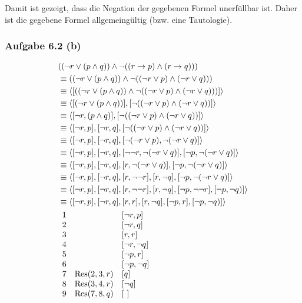 Damit ist gezeigt, dass die Negation der gegebenen Formel unerfüllbar ist. 
Daher ist die gegebene Formel allgemeingültig (bzw. eine Tautologie).

\subsubsection{Aufgabe 6.2 (b)}
\begin{align*}
	&((\neg r\vee(p\wedge q))\wedge\neg((r\to p)\wedge(r\to q)))\\
	&\equiv
	((\neg r\vee(p\wedge q))\wedge\neg((\neg r\vee p)\wedge(\neg r\vee q)))\\
	&\equiv
	\langle[((\neg r\vee(p\wedge q))\wedge\neg((\neg r\vee p)\wedge(\neg r\vee q)))]\rangle\\
	&\equiv
	\langle[(\neg r\vee(p\wedge q))],[\neg((\neg r\vee p)\wedge(\neg r\vee q))]\rangle\\
	&\equiv
	\langle[\neg r,(p\wedge q)],[\neg((\neg r\vee p)\wedge(\neg r\vee q))]\rangle\\
	&\equiv
	\langle[\neg r, p],[\neg r, q],[\neg((\neg r\vee p)\wedge(\neg r\vee q))]\rangle\\
	&\equiv
	\langle[\neg r, p],[\neg r, q],[\neg(\neg r\vee p),\neg(\neg r\vee q)]\rangle\\
	&\equiv
	\langle[\neg r, p],[\neg r, q],[\neg\neg r,\neg(\neg r\vee q)],[\neg p,\neg(\neg r\vee q)]\rangle\\
	&\equiv
	\langle[\neg r, p],[\neg r, q],[r,\neg(\neg r\vee q)],[\neg p,\neg(\neg r\vee q)]\rangle\\
	&\equiv
	\langle[\neg r, p],[\neg r, q],[r,\neg\neg r],[r,\neg q],[\neg p,\neg(\neg r\vee q)]\rangle\\
	&\equiv
	\langle[\neg r, p],[\neg r, q],[r,\neg\neg r],[r,\neg q],[\neg p,\neg\neg r],[\neg p,\neg q)]\rangle\\
	&\equiv
	\langle[\neg r, p],[\neg r, q],[r,r],[r,\neg q],[\neg p, r],[\neg p,\neg q)]\rangle\\
	&\begin{array}{rll}
		1 &&[\neg r,p]\\
		2 &&[\neg r,q]\\
		3 &&[r,r]\\
		4 &&[\neg r,\neg q]\\
		5 &&[\neg p,r]\\
		6 &&[\neg p,\neg q]\\
		7 & \operatorname{Res}(2,3,r) & [q]\\
		8 & \operatorname{Res}(3,4,r) & [\neg q]\\
		9 & \operatorname{Res}(7,8,q) & [~]
	\end{array}
\end{align*}

